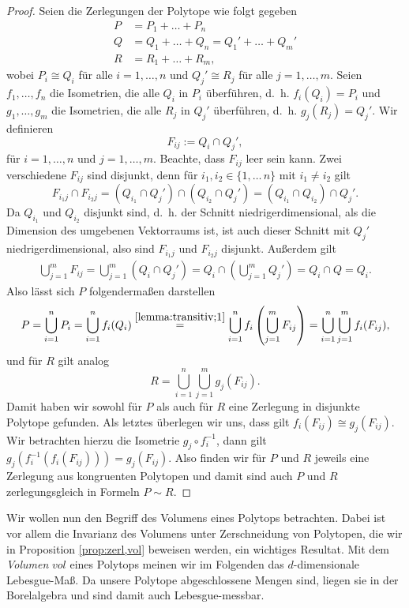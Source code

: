 \documentclass[11pt,titlepage]{article}
\theoremstyle{definition}
\theoremstyle{remark}
\begin{document}
	\begin{proof}
		Seien die Zerlegungen der Polytope wie folgt gegeben
		\begin{align*}
		P &= P_1+\ldots+P_n \\
		Q &= Q_1+\ldots+Q_n = Q_1'+\ldots+Q_m' \\
		R &= R_1+\ldots+R_m,
		\end{align*}
		wobei $P_i\cong Q_i$ für alle $i=1,\ldots,n$ und $Q_j'\cong R_j$ für alle $j=1,\ldots,m$. 
		Seien $f_1,\ldots,f_n$ die Isometrien, die alle $Q_i$ in $P_i$ überführen, 
		d.~h. $f_i(Q_i)=P_i$ und 
		$g_1,\ldots,g_m$ die Isometrien, die alle $R_j$ in $Q_j'$ überführen, d.~h. $g_j(R_j)=Q_j'$.
		Wir definieren
		\[ F_{ij}:=Q_i\cap Q_j',\]
		für $i=1,\ldots,n$ und $j=1,\ldots,m$. Beachte, dass $F_{ij}$ leer sein kann. Zwei verschiedene 
		$F_{ij}$ sind disjunkt, denn für $i_1,i_2\in\{1,\ldots\,n\}$ mit $i_1\neq i_2$ gilt 
		\[F_{i_1 j}\cap F_{i_2 j}=(Q_{i_1}\cap Q_j')\cap(Q_{i_2}\cap Q_j')=(Q_{i_1}\cap Q_{i_2})\cap Q_j'.\] 
		Da $Q_{i_1}$ und $Q_{i_2}$ disjunkt sind, d.~h. der Schnitt niedrigerdimensional, als die Dimension des umgebenen Vektorraums ist, ist 
		auch dieser Schnitt mit $Q_j'$ niedrigerdimensional, also sind $F_{i_1j}$ und $F_{i_2j}$ disjunkt. Außerdem gilt
		\begin{align}
		\bigcup_{j=1}^m F_{ij} = \bigcup_{j=1}^m \left( Q_i \cap Q_j' \right) = 
		Q_i \cap \left( \bigcup_{j=1}^m Q_j' \right)=Q_i \cap Q = Q_i. \label{lemma:transitiv;1}
		\end{align}
		Also lässt sich $P$ folgendermaßen darstellen
		\[ P=\bigcup_{i=1}^n P_i = \bigcup_{i=1}^n f_i(Q_i) \overset{\ref{lemma:transitiv;1}}{=}\bigcup_{i=1}^n f_i 
		\left(\bigcup_{j=1}^m F_{ij} \right) =
		\bigcup_{i=1}^n \bigcup_{j=1}^m f_i(F_{ij}), \]
		und für $R$ gilt analog
		\[ R=\bigcup_{i=1}^n \bigcup_{j=1}^m g_j(F_{ij}). \]
		Damit haben wir sowohl für $P$ als auch für $R$ eine Zerlegung in 
		disjunkte Polytope gefunden. Als letztes überlegen wir uns, 
		dass gilt $f_i(F_{ij})\cong g_j(F_{ij})$. Wir betrachten hierzu die 
		Isometrie $g_j\circ f_i^{-1}$, dann gilt 
		$g_j(f_i^{-1}(f_i(F_{ij})))=g_j(F_{ij})$. Also finden wir für $P$ und 
		$R$ jeweils eine Zerlegung aus kongruenten Polytopen und damit sind 
		auch $P$ und $R$ zerlegungsgleich in Formeln $P\sim R$.
	\end{proof}
	
	Wir wollen nun den Begriff des Volumens eines Polytops betrachten. Dabei ist 
	vor allem die Invarianz des Volumens unter Zerschneidung von Polytopen, die wir in Proposition \ref{prop:zerl,vol} beweisen werden, ein wichtiges Resultat. Mit dem \textsl{Volumen} $vol$ eines Polytops meinen wir im Folgenden das 
	$d$-dimensionale Lebesgue-Maß. Da unsere Polytope abgeschlossene Mengen 
	sind, liegen sie in der Borelalgebra und sind damit auch Lebesgue-messbar.
	
\end{document}
